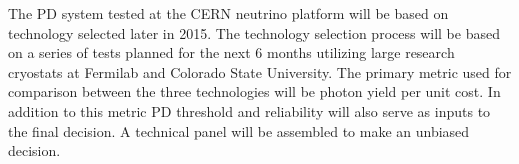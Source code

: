 The PD system tested at the CERN neutrino platform will be based on technology selected later in 2015. The technology selection process will be based on a series of tests planned for the next 6 months utilizing large research cryostats at Fermilab and Colorado State University. The primary metric used for comparison between the three technologies will be photon yield per unit cost. In addition to this metric PD threshold and reliability will also serve as inputs to the final decision. A technical panel will be assembled to make an unbiased decision. 

